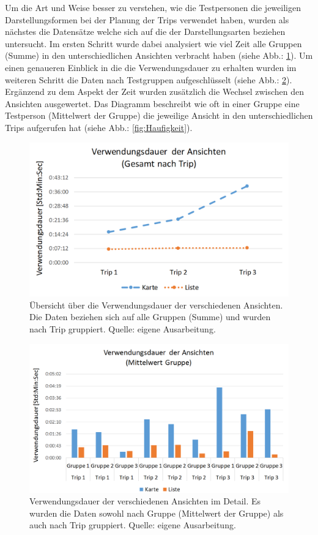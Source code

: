 \documentclass[Bachelorarbeit.tex]{subfiles}
\begin{document}
Um die Art und Weise besser zu verstehen, wie die Testpersonen die jeweiligen Darstellungsformen bei der Planung der Trips verwendet haben, wurden als nächstes die Datensätze welche sich auf die der Darstellungsarten beziehen untersucht. 
Im ersten Schritt wurde dabei analysiert wie viel Zeit alle Gruppen (Summe) in den unterschiedlichen Ansichten verbracht haben (siehe Abb.: \ref{fig:VerwendungsdauerTrip}).
Um einen genaueren Einblick in die die Verwendungsdauer zu erhalten wurden im weiteren Schritt die Daten nach Testgruppen aufgeschlüsselt (siehe Abb.: \ref{fig:VerwendungsdauerGruppe}).
Ergänzend zu dem Aspekt der Zeit wurden zusätzlich die Wechsel zwischen den Ansichten ausgewertet. 
Das Diagramm beschreibt wie oft in einer Gruppe eine Testperson (Mittelwert der Gruppe) die jeweilige Ansicht in den unterschiedlichen Trips aufgerufen hat (siehe Abb.: \ref{fig:Haufigkeit}). 


\begin{figure}[H]
\centering
\includegraphics[width=0.7\linewidth]{img/Evaluation/Darstellungsformen/VerwendungsdauerTrip}
\caption[Verwendungsdauer der verschiedenen Ansichten.]{Übersicht über die Verwendungsdauer der verschiedenen Ansichten. Die Daten beziehen sich auf alle Gruppen (Summe) und wurden nach Trip gruppiert. Quelle: eigene Ausarbeitung.}
\label{fig:VerwendungsdauerTrip}
\end{figure}

\begin{figure}[H]
\centering
\includegraphics[width=0.7\linewidth]{img/Evaluation/Darstellungsformen/VerwendungsdauerGruppe}
\caption[Übersicht Verwendungsdauer Ansichten (Detail)]{Verwendungsdauer der verschiedenen Ansichten im Detail. Es wurden die Daten sowohl nach Gruppe (Mittelwert der Gruppe) als auch nach Trip gruppiert. Quelle: eigene Ausarbeitung.}
\label{fig:VerwendungsdauerGruppe}
\end{figure}
\end{document}
